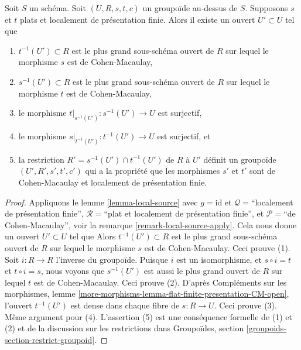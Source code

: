 \begin{lemma}
\label{lemma-make-CM}
Soit $S$ un schéma.
Soit $(U, R, s, t, c)$ un groupoïde au-dessus de $S$.
Supposons $s$ et $t$ plats et localement de présentation finie.
Alors il existe un ouvert $U' \subset U$ tel que
\begin{enumerate}
\item $t^{-1}(U') \subset R$ est le plus grand sous-schéma ouvert de
$R$ sur lequel le morphisme $s$ est de Cohen-Macaulay,
\item $s^{-1}(U') \subset R$ est le plus grand sous-schéma ouvert de
$R$ sur lequel le morphisme $t$ est de Cohen-Macaulay,
\item le morphisme $t|_{s^{-1}(U')} : s^{-1}(U') \to U$ est
surjectif,
\item le morphisme $s|_{t^{-1}(U')} : t^{-1}(U') \to U$ est
surjectif, et
\item la restriction $R' = s^{-1}(U') \cap t^{-1}(U')$
de $R$ à $U'$ définit un groupoïde $(U', R', s', t', c')$ qui a la propriété
que les morphismes $s'$ et $t'$ sont de Cohen-Macaulay et localement de
présentation finie.
\end{enumerate}
\end{lemma}

\begin{proof}
Appliquons le
lemme \ref{lemma-local-source}
avec
$g = \text{id}$ et
$\mathcal{Q} =$``localement de présentation finie'',
$\mathcal{R} =$``plat et localement de présentation finie'', et
$\mathcal{P}=$``de Cohen-Macaulay'', voir
la remarque \ref{remark-local-source-apply}.
Cela nous donne un ouvert $U' \subset U$ tel que
Alors $t^{-1}(U') \subset R$ est le plus grand sous-schéma ouvert de $R$
sur lequel le morphisme $s$ est de Cohen-Macaulay.
Ceci prouve (1).
Soit $i : R \to R$ l'inverse du groupoïde.
Puisque $i$ est un isomorphisme, et $s \circ i = t$ et $t \circ i = s$,
nous voyons que $s^{-1}(U')$ est aussi le plus grand ouvert de $R$ sur lequel $t$ est
de Cohen-Macaulay. Ceci prouve (2).
D'après
Compléments sur les morphismes,
lemme \ref{more-morphisms-lemma-flat-finite-presentation-CM-open},
l'ouvert $t^{-1}(U')$ est dense dans chaque fibre de $s : R \to U$.
Ceci prouve (3). Même argument pour (4).
L'assertion (5) est une conséquence formelle de (1) et (2) et de la discussion
sur les restrictions dans
Groupoïdes, section \ref{groupoids-section-restrict-groupoid}.
\end{proof}








